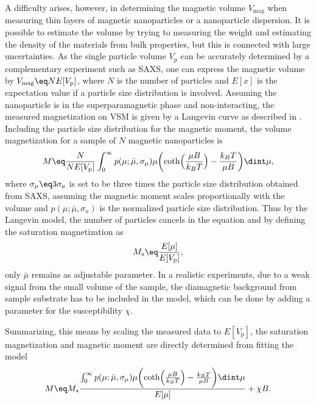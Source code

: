 \documentclass[\main/dresen_thesis.tex]{subfiles}
\begin{document}
    A difficulty arises, however, in determining the magnetic volume $V_\mathrm{mag}$ when measuring thin layers of magnetic nanoparticles or a nanoparticle dispersion.
    It is possible to estimate the volume by trying to measuring the weight and estimating the density of the materials from bulk properties, but this is connected with large uncertainties.
    As the single particle volume $V_\mathrm{p}$ can be accurately determined by a complementary experiment such as SAXS, one can express the magnetic volume by $V_\mathrm{mag} \eq N E[ V_\mathrm{p} ]$, where $N$ is the number of particles and $E[x]$ is the expectation value if a particle size distribution is involved.
    Assuming the nanoparticle is in the superparamagnetic phase and non-interacting, the measured magnetization on VSM is given by a Langevin curve as described in .
    Including the particle size distribution for the magnetic moment, the volume magnetization for a sample of $N$ magnetic nanoparticles is
    \begin{align}
      M \eq \frac{N}{N E[ V_\mathrm{p} ]}
      \int_{0}^{\infty} p(\mu; \bar{\mu}, \sigma_\mu) \mu \biggl( \coth\Bigl(\frac{\mu B}{k_B T} \Bigr) - \frac{k_B T}{\mu B} \biggr) \dint \mu,
    \end{align}
    where $\sigma_\mu \eq 3 \sigma_a$ is set to be three times the particle size distribution obtained from SAXS, assuming the magnetic moment scales proportionally with the volume and $p(\mu; \bar{\mu}, \sigma_u)$ is the normalized particle size distribution.
    Thus by the Langevin model, the number of particles cancels in the equation and by defining the saturation magnetization as
    \begin{align}
      M_s \eq \frac{E[\mu]}{E[V_\mathrm{p}]},
    \end{align}
    only $\bar{\mu}$ remains as adjustable parameter.
    In a realistic experiments, due to a weak signal from the small volume of the sample, the diamagnetic background from \ie sample substrate has to be included in the model, which can be done by adding a parameter for the susceptibility $\chi$.

    Summarizing, this means by scaling the measured data to $E[V_\mathrm{p}]$, the saturation magnetization and magnetic moment are directly determined from fitting the model
    \begin{align}
      M \eq M_s
      \frac{\int_{0}^{\infty} p(\mu; \bar{\mu}, \sigma_\mu) \mu \biggl( \coth\Bigl(\frac{\mu B}{k_B T} \Bigr) - \frac{k_B T}{\mu B} \biggr) \dint \mu}{E[\mu]} + \chi B.
    \end{align}

    
\end{document}

